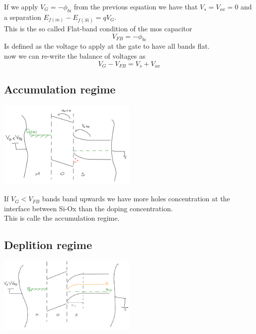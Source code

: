 If we apply $V_G=-\phi_{bi}$ from the previous equation we have that $V_s=V_{ox}=0$ and a separation $E_{f(m)}-E_{f(Si)}=qV_G$.\\
This is the so called Flat-band condition of the mos capacitor 
\begin{equation}
V_{FB}=-\phi_{bi}
\end{equation}
Is defined as the voltage to apply at the gate to have all bands flat.\\
now we can re-write the balance of voltages as
\begin{equation}
V_G-V_{FB}=V_s+V_{ox}
\end{equation}
\subsection{Accumulation regime}
\centering
\includegraphics[width=0.5\textwidth]{mos_accum.png}\\
\raggedright


If $V_G<V_{FB}$ bands band upwards we have more holes concentration at the interface between Si-Ox than the doping concentration. \\
This is calle the accumulation regime.
\subsection{Deplition regime} 
\centering
\includegraphics[width=0.5\textwidth]{mos_depl.png}\\
\raggedright

